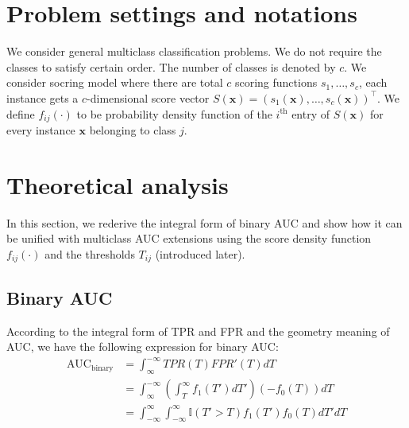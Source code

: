 \documentclass[twoside,11pt]{article}
\renewcommand{\>}{{\rightarrow}}
\renewcommand{\hat}{\widehat}
\newcommand{\argmax}{\textup{\textrm{argmax}}}
\newcommand{\1}{{\mathbf 1}}
\newcommand{\0}{{\mathbf 0}}
\begin{document}
\section{Problem settings and notations}
We consider general multiclass classification problems. We do not require the classes to satisfy certain order. 
The number of classes is denoted by $c$.
We consider socring model where there are total $c$ scoring functions $s_1, \dots, s_c$, each instance gets a $c$-dimensional score vector $S(\textbf{x}) = (s_1(\textbf{x}), \dots, s_c(\textbf{x}))^{\top}$. 
We define $f_{ij}(\cdot)$ to be probability density function of the $i^{\text{th}}$ entry of $S(\textbf{x})$ for every instance $\textbf{x}$ belonging to class $j$.

\section{Theoretical analysis}
In this section, we rederive the integral form of binary AUC and show how it can be unified with multiclass AUC extensions using the score density function $f_{ij}(\cdot)$ and the thresholds $T_{ij}$ (introduced later). %

\subsection{Binary AUC}
According to the integral form of TPR and FPR and the geometry meaning of AUC, we have the following expression for binary AUC:
\begin{align}\label{eq_binary_AUC}
    \text{AUC}_{\text{binary}} &= \int_{\infty}^{-\infty}TPR(T)FPR'(T)dT\\
    &= \int_{\infty}^{-\infty}(\int_{T}^{\infty}f_1(T')dT')(-f_0(T))dT\\
    &= \int_{-\infty}^{\infty}\int_{-\infty}^{\infty}\mathbb{I}(T'>T)f_1(T')f_0(T)dT'dT
\end{align}
\end{document}
